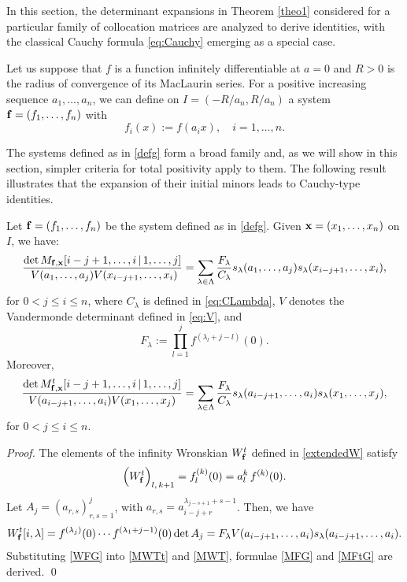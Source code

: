 \documentclass[smallextended]{svjour3}       %
\begin{document}
In this section,  the determinant expansions in Theorem \ref{theo1} considered for a particular family of collocation matrices are analyzed to derive identities, with the classical Cauchy formula \eqref{eq:Cauchy} emerging as a special case. 

Let us suppose that  $f$ is a function infinitely differentiable at \(a=0\) and  $R> 0$ is the radius of convergence of its MacLaurin series. 
  For a positive increasing sequence   \( a_1,  \ldots, a_n \),  we can  define  on  $I=(-R/a_n,R/a_n)$ a system \( {\bf f} = (f_1, \dots, f_n) \) with  
\begin{equation}\label{defg}
  f_i(x) := f(a_i x),\quad i = 1, \dots, n.
\end{equation}  
 

The systems defined as in \eqref{defg} form a broad family and, as we will show in this section, simpler criteria for total positivity apply to them. 
The following result illustrates that the expansion of their initial minors leads to Cauchy-type identities.  
 
\begin{theorem}\label{theo}
 Let \( {\bf f} = (f_1,  \dots, f_n) \) be the system defined as in \eqref{defg}. Given ${\bf x}=(x_1,\dots, x_n)$ on $I$,  we have:
  \begin{equation}\label{MFG}
  \frac{ \det M_{\bf f, \bf x}  {[i-j+1,\dots,i\,|\,1,\dots, j]} }{ V(a_{1},\dots,{
  a_j})V(x_{i-j+1},\dots,x_i)} =  \sum_{\lambda\in\Lambda}\frac{F_\lambda}{C_\lambda}s_{\lambda}(a_{1},\dots,a_j)s_{\lambda}(x_{i-j+1},\dots,x_i),
\end{equation}
for  $0 < j \leq i \leq n$, where $C_{\lambda}$ is defined in \eqref{eq:CLambda}, $V$ denotes the Vandermonde determinant  defined in  \eqref{eq:V}, and
\begin{equation}  \label{eq:FLambda}
    F_\lambda:=\prod_{l=1}^j f^{(\lambda_l+j-l)}(0). 
\end{equation}
Moreover, 
\begin{equation}\label{MFtG}
  \frac{     \det M_{\bf f, \bf x}^t {[i-j+1,\dots,i\,|\,1,\dots, j]}}{V(a_{i-j+1},\dots,a_i)V(x_{1},\dots,x_j) }= \sum_{\lambda\in\Lambda}\frac{F_\lambda}{C_\lambda}s_{\lambda}(a_{i-j+1},\dots,a_i)s_{\lambda}(x_{1},\dots,x_j),  
\end{equation}  
for $0 < j \leq i \leq n$.
\end{theorem}
\begin{proof}
The elements of the infinity Wronskian \( W^t_{\bf f} \) defined in  \eqref{extendedW} satisfy
\[   
\Big(W^t_{\bf f}\Big)_{l,\,k+1} = f_l^{(k)}(0) = a_l^k\,f^{(k)}(0).  
\]
Let \( A_j = (a_{r,s})_{r,s=1}^j \), with \( a_{r,s} = a^{\lambda_{j-s+1} + s - 1}_{i-j+r} \). Then, we have  
\begin{equation}\label{WFG}
    W_{\bf f}^t{[i,\lambda]} = f^{(\lambda_j)}(0)\cdots f^{(\lambda_1+j-1)}(0) \det A_j  
    = F_\lambda V( a_{i-j+1}, \dots, a_i) s_{\lambda}(a_{i-j+1}, \dots, a_i).
\end{equation}  
Substituting \eqref{WFG} into \eqref{MWTt} and \eqref{MWT}, formulae \eqref{MFG} and \eqref{MFtG} are derived.  \qed
\end{proof}
\end{document}
